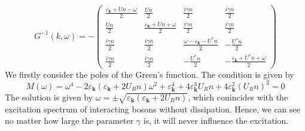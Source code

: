 \documentclass[aps,onecolumn,superscriptaddress,notitlepage,longbibliography]{revtex4-1}
\begin{document}
\begin{equation}
  G^{- 1} (k, \omega) = - \left(\begin{array}{cccc}
    \frac{\varepsilon_{\mathbf{k}} + U n - \omega}{2} & \frac{U n}{2} &
    \frac{i \gamma n}{2} & \frac{i \gamma n}{2}\\
    \frac{U n}{2} & \frac{\varepsilon_{\mathbf{k}} + U n + \omega}{2} &
    \frac{i \gamma n}{2} & \frac{i \gamma n}{2}\\
    \frac{i \gamma n}{2} & \frac{i \gamma n}{2} & \frac{\omega -
    \varepsilon_{\mathbf{k}} - U^{\ast} n}{2} & - \frac{U^{\ast} n}{2}\\
    \frac{i \gamma n}{2} & \frac{i \gamma n}{2} & - \frac{U^{\ast} n}{2} & -
    \frac{\varepsilon_{\mathbf{k}} + U^{\ast} n + \omega}{2}
  \end{array}\right)
\end{equation}
We firstly consider the poles of the Green's function. The condition is given
by
\begin{equation}
  M (\omega) = \omega^4 - 2 \varepsilon_{\mathbf{k}}
  (\varepsilon_{\mathbf{k}} + 2 U_R n) \omega^2 +
  \varepsilon_{\mathbf{k}}^4 + 4 \varepsilon_{\mathbf{k}}^3 U_R n + 4
  \varepsilon_{\mathbf{k}}^2 (U_R n)^2 = 0
\end{equation}
The solution is given by $\omega = \pm \sqrt{\varepsilon_{\mathbf{k}}
(\varepsilon_{\mathbf{k}} + 2 U_R n)}$, which conincides with the excitation
spectrum of interacting bosons without dissipation. Hence, we can see no
matter how large the parameter $\gamma$ is, it will never influence the
excitation.
\end{document}
